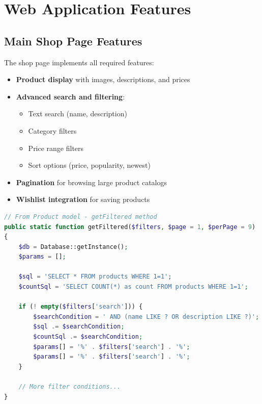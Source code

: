 \documentclass[14pt,a4paper]{article}
\begin{document}
\section{Web Application Features}

\subsection{Main Shop Page Features}
The shop page implements all required features:
\begin{itemize}
    \item \textbf{Product display} with images, descriptions, and prices
    \item \textbf{Advanced search and filtering}:
        \begin{itemize}
            \item Text search (name, description)
            \item Category filters
            \item Price range filters
            \item Sort options (price, popularity, newest)
        \end{itemize}
    \item \textbf{Pagination} for browsing large product catalogs
    \item \textbf{Wishlist integration} for saving products
\end{itemize}

\begin{lstlisting}[language=PHP, caption=Shop filtering implementation]
// From Product model - getFiltered method
public static function getFiltered($filters, $page = 1, $perPage = 9)
{
    $db = Database::getInstance();
    $params = [];

    $sql = 'SELECT * FROM products WHERE 1=1';
    $countSql = 'SELECT COUNT(*) as count FROM products WHERE 1=1';

    if (! empty($filters['search'])) {
        $searchCondition = ' AND (name LIKE ? OR description LIKE ?)';
        $sql .= $searchCondition;
        $countSql .= $searchCondition;
        $params[] = '%' . $filters['search'] . '%';
        $params[] = '%' . $filters['search'] . '%';
    }
    
    // More filter conditions...
}
\end{lstlisting}
\end{document}
